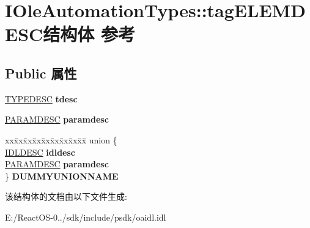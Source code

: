 \hypertarget{struct_i_ole_automation_types_1_1tag_e_l_e_m_d_e_s_c}{}\section{I\+Ole\+Automation\+Types\+:\+:tag\+E\+L\+E\+M\+D\+E\+S\+C结构体 参考}
\label{struct_i_ole_automation_types_1_1tag_e_l_e_m_d_e_s_c}
\subsection*{Public 属性}
\begin{DoxyCompactItemize}
\item 
\mbox{\label{struct_i_ole_automation_types_1_1tag_e_l_e_m_d_e_s_c_a852b877118a9031ddf6cc743abf0d51d}} 
\hyperlink{struct_i_ole_automation_types_1_1tag_t_y_p_e_d_e_s_c}{T\+Y\+P\+E\+D\+E\+SC} {\bfseries tdesc}
\item 
\mbox{\label{struct_i_ole_automation_types_1_1tag_e_l_e_m_d_e_s_c_a7ccdb453864643dfe75af1a33e8fe612}} 
\hyperlink{struct_i_ole_automation_types_1_1tag_p_a_r_a_m_d_e_s_c}{P\+A\+R\+A\+M\+D\+E\+SC} {\bfseries paramdesc}
\item 
\mbox{\label{struct_i_ole_automation_types_1_1tag_e_l_e_m_d_e_s_c_a30f9414c3c516a2928e9d72bfb766039}} 
\begin{tabbing}
xx\=xx\=xx\=xx\=xx\=xx\=xx\=xx\=xx\=\kill
union \{\\
\>\hyperlink{struct_i_ole_automation_types_1_1tag_i_d_l_d_e_s_c}{IDLDESC} {\bfseries idldesc}\\
\>\hyperlink{struct_i_ole_automation_types_1_1tag_p_a_r_a_m_d_e_s_c}{PARAMDESC} {\bfseries paramdesc}\\
\} {\bfseries DUMMYUNIONNAME}\\

\end{tabbing}\end{DoxyCompactItemize}


该结构体的文档由以下文件生成\+:\begin{DoxyCompactItemize}
\item 
E\+:/\+React\+O\+S-\/0../sdk/include/psdk/oaidl.\+idl\end{DoxyCompactItemize}
